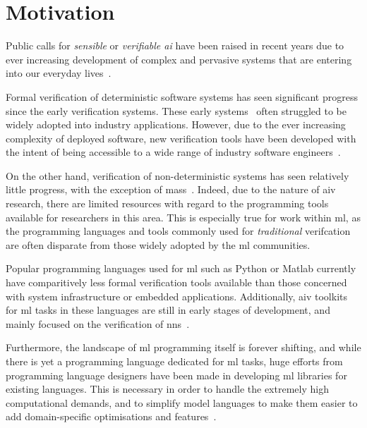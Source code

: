 \section{Motivation}

Public calls for \textit{sensible} or \textit{verifiable \Gls{ai}} have been raised in recent years due to ever increasing
development of complex and pervasive systems that are entering into our everyday lives~\citep{russell2016}.

Formal verification of deterministic software systems has seen significant progress since the early
verification systems. These early systems~\citep{polak1979, boyer1990, guaspari1993} often struggled to be 
widely adopted into industry applications. However, due to the ever increasing complexity of deployed
software, new verification tools have been developed with the intent of being accessible to a wide range
of industry software engineers~\citep{fisher2017}.

On the other hand, verification of non-deterministic systems has 
seen relatively little progress, with the exception of \Glspl{mas}~\citep{lomuscio2017, kouvaros2016}.
Indeed, due to the nature of \gls{aiv} research, there are limited resources with regard to the 
programming tools available for researchers in this area. This is especially true for work
within \gls{ml}, as the programming languages and tools commonly used for \textit{traditional} verifcation are often
disparate from those widely adopted by the \gls{ml} communities. 

Popular programming languages used for \gls{ml} such as Python or Matlab currently have comparitively less
formal verification tools available than those concerned with system infrastructure or embedded applications.
Additionally, \gls{aiv} toolkits for \gls{ml} tasks in these languages are still in early stages of development, and mainly focused
on the verification of \glspl{nn}~\citep{kokke2020}. 

Furthermore, the landscape of \gls{ml} programming itself is forever shifting, and while there is yet a programming 
language dedicated for \gls{ml} tasks, huge efforts from programming language designers have been made 
in developing \gls{ml} libraries for existing languages. This is necessary in order to handle the 
extremely high computational demands, and to simplify 
model languages to make them easier to add domain-specific optimisations and features~\citep{innes2017}.

